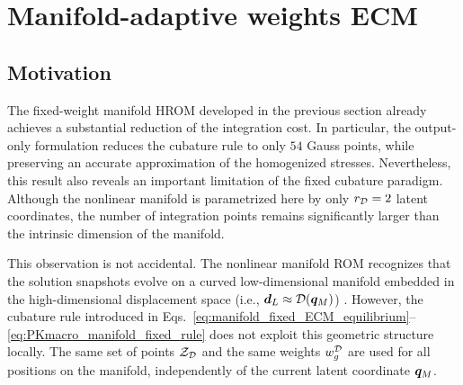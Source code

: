 \documentclass[11pt,a4paper]{article}
\newcommand{\PROMPT}[1]{ }
\begin{document}
\section{Manifold-adaptive weights ECM}
\label{sec:MAW_ECM}

\PROMPT{}

\PROMPT{}

\PROMPT{}

%

\PROMPT{}

%

\subsection{Motivation}
\label{sec:motivation_MAW_ECM}
The fixed-weight manifold HROM developed in the previous section already
achieves a substantial reduction of the integration cost. In particular, the
output-only formulation reduces the cubature rule to only \(54\) Gauss points,
while preserving an accurate approximation of the homogenized stresses.
Nevertheless, this result also reveals an important limitation of the fixed
cubature paradigm. Although the nonlinear manifold is parametrized here by only
\(r_{\mathcal{D}}=2\) latent coordinates, the number of integration points remains
significantly larger than the intrinsic dimension of the manifold.

This observation is not accidental. The nonlinear manifold ROM recognizes that
the solution snapshots evolve on a curved low-dimensional manifold embedded in
the high-dimensional displacement space (i.e., $\bm{d}_L \approx \mathcal{\boldsymbol{D}}(\bm{q}_M)$) . However, the cubature rule introduced
in Eqs.~\eqref{eq:manifold_fixed_ECM_equilibrium}--%
\eqref{eq:PKmacro_manifold_fixed_rule} does not exploit this geometric
structure locally. The same set of points \(\mathcal{Z}_{\mathcal{D}}\) and the same weights
\(w^{\mathcal{D}}_{g}\) are used for all positions on the manifold, independently of the
current latent coordinate \(\bm{q}_M\).
\end{document}
